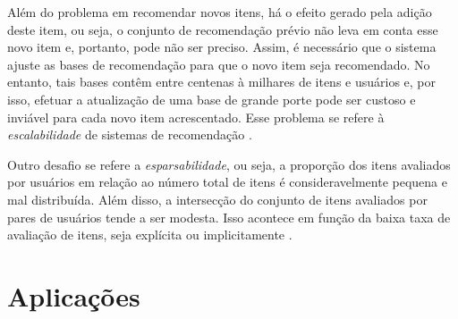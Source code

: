     Além do problema em recomendar novos itens, há o efeito gerado pela adição deste item, ou seja, o conjunto de recomendação prévio não leva em conta esse novo item e, portanto, pode não ser preciso. Assim, é necessário que o sistema ajuste as bases de recomendação para que o novo item seja recomendado. No entanto, tais bases contêm entre centenas à milhares de itens e usuários e, por isso, efetuar a atualização de uma base de grande porte pode ser custoso e inviável para cada novo item acrescentado. Esse problema se refere à \textit{escalabilidade} de sistemas de recomendação \cite{Lue2012}. 
    
    Outro desafio se refere a \textit{esparsabilidade}, ou seja, a proporção dos itens avaliados por usuários em relação ao número total de itens é consideravelmente pequena e mal distribuída. Além disso, a intersecção do conjunto de itens avaliados por pares de usuários tende a ser modesta. Isso acontece em função da baixa taxa de avaliação de itens, seja explícita ou implicitamente \cite{Lue2012}.


\section{Aplicações}



